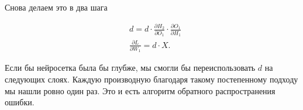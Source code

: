 \begin{sol}
Снова делаем это в два шага

\begin{equation*} 
	\begin{aligned}
		&  d = d \cdot  \frac{\partial H_2}{\partial O_1} \cdot \frac{\partial O_1}{\partial H_1} \\
		&  \frac{\partial L}{\partial W_1} = d \cdot X.
	\end{aligned}
\end{equation*}

Если бы нейросетка была бы глубже, мы смогли бы переиспользовать $d$ на следующих слоях. Каждую производную благодаря такому постепенному подходу мы нашли ровно один раз. Это и есть алгоритм обратного распространения ошибки. 
\end{sol} 


